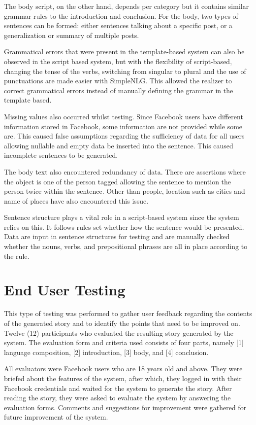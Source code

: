 The body script, on the other hand, depends per category but it contains similar grammar rules to the introduction and conclusion. For the body, two types of sentences can be formed: either sentences talking about a specific post, or a generalization or summary of multiple posts.

Grammatical errors that were present in the template-based system can also be observed in the script based system, but with the flexibility of script-based, changing the tense of the verbs, switching from singular to plural and the use of punctuations are made easier with SimpleNLG. This allowed the realizer to correct grammatical errors instead of manually defining the grammar in the template based.

Missing values also occurred whilst testing. Since Facebook users have different information stored in Facebook, some information are not provided while some are. This caused false assumptions regarding the sufficiency of data for all users allowing nullable and empty data be inserted into the sentence. This caused incomplete sentences to be generated. 

The body text also encountered redundancy of data. There are assertions where the object is one of the person tagged allowing the sentence to mention the person twice within the sentence. Other than people, location such as cities and name of places have also encountered this issue.

Sentence structure plays a vital role in a script-based system since the system relies on this. It follows rules set whether how the sentence would be presented. Data are input in sentence structures for testing and are manually checked whether the nouns, verbs, and prepositional phrases are all in place according to the rule.

\section{End User Testing}
This type of testing was performed to gather user feedback regarding the contents of the generated story and to identify the points that need to be improved on. Twelve (12) participants who evaluated the resulting story generated by the system. The evaluation form and criteria used consists of four parts, namely [1] language composition, [2] introduction, [3] body, and [4] conclusion.

All evaluators were Facebook users who are 18 years old and above. They were briefed about the features of the system, after which, they logged in with their Facebook credentials and waited for the system to generate the story. After reading the story, they were asked to evaluate the system by answering the evaluation forms. Comments and suggestions for improvement were gathered for future improvement of the system.


